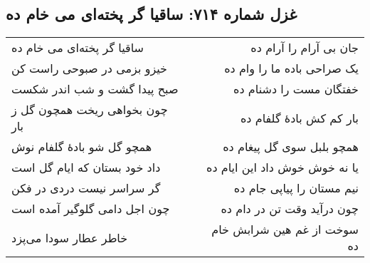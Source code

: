 \begin{center}
\section*{غزل شماره ۷۱۴: ساقیا گر پخته‌ای می خام ده}
\label{sec:714}
\begin{longtable}{l p{0.5cm} r}
ساقیا گر پخته‌ای می خام ده
&&
جان بی آرام را آرام ده
\\
خیزو بزمی در صبوحی راست کن
&&
یک صراحی باده ما را وام ده
\\
صبح پیدا گشت و شب اندر شکست
&&
خفتگان مست را دشنام ده
\\
چون بخواهی ریخت همچون گل ز بار
&&
بار کم کش بادهٔ گلفام ده
\\
همچو گل شو بادهٔ گلفام نوش
&&
همچو بلبل سوی گل پیغام ده
\\
داد خود بستان که ایام گل است
&&
یا نه خوش خوش داد این ایام ده
\\
گر سراسر نیست دردی در فکن
&&
نیم مستان را پیاپی جام ده
\\
چون اجل دامی گلوگیر آمده است
&&
چون درآید وقت تن در دام ده
\\
خاطر عطار سودا می‌پزد
&&
سوخت از غم هین شرابش خام ده
\\
\end{longtable}
\end{center}
